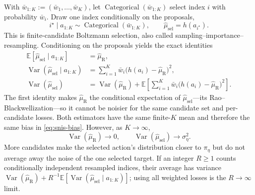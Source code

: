 \documentclass[10pt]{article}
\newcommand{\E}{\mathbb{E}}
\newcommand{\Var}{\operatorname{Var}}
\newcommand{\R}{\mathrm{R}}
\newcommand{\sel}{\mathrm{sel}}
\begin{document}
With $\bar w_{1:K}:=(\bar w_1,\ldots,\bar w_K)$, let
$\operatorname{Categorical}(\bar w_{1:K})$ select index $i$ with probability
$\bar w_i$.  Draw one index conditionally on the proposals,
\begin{equation}
  i^\star\mid a_{1:K}\sim\operatorname{Categorical}(\bar w_{1:K}),
  \qquad \widehat\mu_{\sel}=h(a_{i^\star}).
  \label{eq:selection}
\end{equation}
This is finite-candidate Boltzmann selection, also called
sampling--importance--resampling.  Conditioning on the proposals yields the
exact identities
\begin{align}
  \E[\widehat\mu_{\sel}\mid a_{1:K}]&=\widehat\mu_{\R},\label{eq:rb-mean}\\
  \Var(\widehat\mu_{\sel}\mid a_{1:K})
  &=\sum_{i=1}^K\bar w_i\bigl(h(a_i)-\widehat\mu_{\R}\bigr)^2,\label{eq:rb-cond}\\
  \Var(\widehat\mu_{\sel})
  &=\Var(\widehat\mu_{\R})+
  \E\!\left[\sum_{i=1}^K\bar w_i
  \bigl(h(a_i)-\widehat\mu_{\R}\bigr)^2\right].
  \label{eq:rb}
\end{align}
The first identity makes $\widehat\mu_{\R}$ the conditional expectation of
$\widehat\mu_{\sel}$---its Rao--Blackwellization---so it cannot be noisier for
the same candidate set and per-candidate losses.  Both estimators have the same
finite-$K$ mean and therefore the same bias in \eqref{eq:snis-bias}.  However,
as $K\to\infty$,
\begin{equation}
  \Var(\widehat\mu_{\R})\to0,
  \qquad
  \Var(\widehat\mu_{\sel})\to\sigma_\eta^2.
  \label{eq:limits}
\end{equation}
More candidates make the selected action's distribution closer to $\pi_\eta$
but do not average away the noise of the one selected target.  If an integer
$R\geq1$ counts conditionally independent resampled indices, their average has
variance $\Var(\widehat\mu_{\R})+
R^{-1}\E[\Var(\widehat\mu_{\sel}\mid a_{1:K})]$; using all weighted losses is
the $R\to\infty$ limit.
\end{document}
